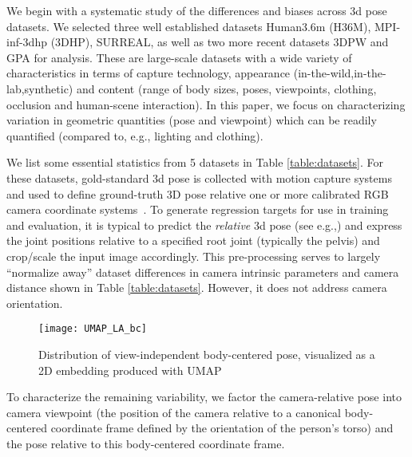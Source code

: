 \documentclass[runningheads]{llncs}
\begin{document}
We begin with a systematic study of the differences and biases across 3d pose
datasets.  We selected three well established datasets Human3.6m (H36M),
MPI-inf-3dhp (3DHP), SURREAL, as well as two more recent datasets 3DPW and GPA
for analysis.  These are large-scale datasets with a wide variety of
characteristics in terms of capture technology, appearance
(in-the-wild,in-the-lab,synthetic) and content (range of body sizes, poses,
viewpoints, clothing, occlusion and human-scene interaction).  In this paper,
we focus on characterizing variation in geometric quantities (pose and viewpoint)
which can be readily quantified (compared to, e.g., lighting and clothing).

We list some essential statistics from 5 datasets in Table \ref{table:datasets}. 
For these datasets, gold-standard 3d pose is collected with motion capture
systems~\cite{h36m_pami,humaneva,Trumble:BMVC:2017,gpa} and used to define
ground-truth 3D pose relative one or more calibrated RGB camera coordinate
systems~\cite{h36m_pami,inthewildeccv2018,mono_3dhp2017,varol17_surreal,gpa}.
To generate regression targets for use in training and evaluation, it is
typical to predict the {\em relative} 3d pose (see
e.g.,\cite{rootnet,integral}) and express the joint positions relative to a
specified root joint (typically the pelvis) and crop/scale the input image
accordingly.  This pre-processing serves to largely ``normalize away'' dataset
differences in camera intrinsic parameters and camera distance shown in Table
\ref{table:datasets}.  However, it does not address camera orientation.

\begin{wrapfigure}[20]{r}{0.5\textwidth}
\vspace{-0.5in}
\begin{center}
\texttt{[image: UMAP\_LA\_bc]}
\caption{\small Distribution of view-independent body-centered pose, visualized 
   as a 2D embedding produced with UMAP \cite{mcinnes2018umap-software}}
   \label{fig:bclaumap}
\end{center}
\end{wrapfigure}

To characterize the remaining variability, we factor the camera-relative
pose into camera viewpoint (the position of the camera relative to a canonical
body-centered coordinate frame defined by the orientation of the person's
torso) and the pose relative to this body-centered coordinate frame. 
\end{document}
